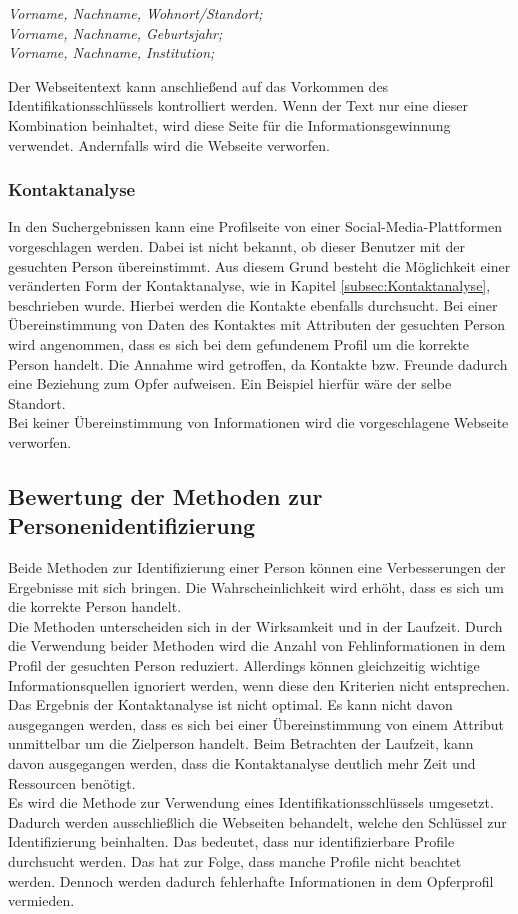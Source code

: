 		\textit{Vorname, Nachname, Wohnort/Standort;}\\
		\textit{Vorname, Nachname, Geburtsjahr;}\\
		\textit{Vorname, Nachname, Institution;}
		
		Der Webseitentext kann anschließend auf das Vorkommen des Identifikationsschlüssels kontrolliert werden. Wenn der Text nur eine dieser Kombination beinhaltet, wird diese Seite für die Informationsgewinnung verwendet. Andernfalls wird die Webseite verworfen.\\
		
		\subsubsection{Kontaktanalyse}	
		In den Suchergebnissen kann eine Profilseite von einer Social-Media-Plattformen vorgeschlagen werden. Dabei ist nicht bekannt, ob dieser Benutzer mit der gesuchten Person übereinstimmt. Aus diesem Grund besteht die Möglichkeit einer veränderten Form der Kontaktanalyse, wie in Kapitel \ref{subsec:Kontaktanalyse}, beschrieben wurde. Hierbei werden die Kontakte ebenfalls durchsucht. Bei einer Übereinstimmung von Daten des Kontaktes mit Attributen der gesuchten Person wird angenommen, dass es sich bei dem gefundenem Profil um die korrekte Person handelt. Die Annahme wird getroffen, da Kontakte bzw. Freunde dadurch eine Beziehung zum Opfer aufweisen. Ein Beispiel hierfür wäre der selbe Standort.\\
		Bei keiner Übereinstimmung von Informationen wird die vorgeschlagene Webseite verworfen.	
			
	\subsection{Bewertung der Methoden zur Personenidentifizierung}
	Beide Methoden zur Identifizierung einer Person können eine Verbesserungen der Ergebnisse mit sich bringen. Die Wahrscheinlichkeit wird erhöht, dass es sich um die korrekte Person handelt. \\
	Die Methoden unterscheiden sich in der Wirksamkeit und in der Laufzeit. Durch die Verwendung beider Methoden wird die Anzahl von Fehlinformationen in dem Profil der gesuchten Person reduziert. Allerdings können gleichzeitig wichtige Informationsquellen ignoriert werden, wenn diese den Kriterien nicht entsprechen.\\
	Das Ergebnis der Kontaktanalyse ist nicht optimal. Es kann nicht davon ausgegangen werden, dass es sich bei einer Übereinstimmung von einem  Attribut unmittelbar um die Zielperson handelt. Beim Betrachten der Laufzeit, kann davon ausgegangen werden, dass die Kontaktanalyse deutlich mehr Zeit und Ressourcen benötigt.\\
	Es wird die Methode zur Verwendung eines Identifikationsschlüssels umgesetzt. Dadurch werden ausschließlich die Webseiten behandelt, welche den Schlüssel zur Identifizierung beinhalten. Das bedeutet, dass nur identifizierbare Profile durchsucht werden. Das hat zur Folge, dass manche Profile nicht beachtet werden. Dennoch werden dadurch fehlerhafte Informationen in dem Opferprofil vermieden.
	

